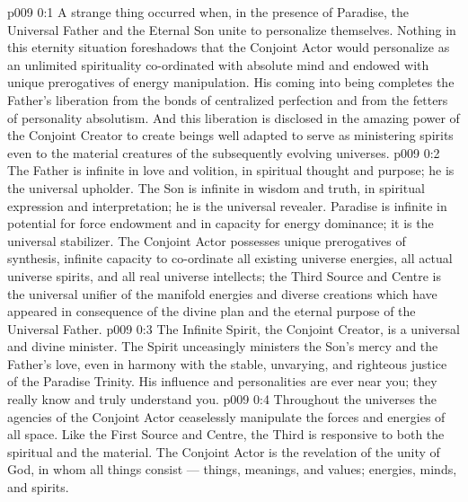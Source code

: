 \author{Divine Counsellor}
\vs p009 0:1 A strange thing occurred when, in the presence of Paradise, the Universal Father and the Eternal Son unite to personalize themselves. Nothing in this eternity situation foreshadows that the Conjoint Actor would personalize as an unlimited spirituality co\hyp{}ordinated with absolute mind and endowed with unique prerogatives of energy manipulation. His coming into being completes the Father’s liberation from the bonds of centralized perfection and from the fetters of personality absolutism. And this liberation is disclosed in the amazing power of the Conjoint Creator to create beings well adapted to serve as ministering spirits even to the material creatures of the subsequently evolving universes.
\vs p009 0:2 \pc The Father is infinite in love and volition, in spiritual thought and purpose; he is the universal upholder. The Son is infinite in wisdom and truth, in spiritual expression and interpretation; he is the universal revealer. Paradise is infinite in potential for force endowment and in capacity for energy dominance; it is the universal stabilizer. The Conjoint Actor possesses unique prerogatives of synthesis, infinite capacity to co\hyp{}ordinate all existing universe energies, all actual universe spirits, and all real universe intellects; the Third Source and Centre is the universal unifier of the manifold energies and diverse creations which have appeared in consequence of the divine plan and the eternal purpose of the Universal Father.
\vs p009 0:3 The Infinite Spirit, the Conjoint Creator, is a universal and divine minister. The Spirit unceasingly ministers the Son’s mercy and the Father’s love, even in harmony with the stable, unvarying, and righteous justice of the Paradise Trinity. His influence and personalities are ever near you; they really know and truly understand you.
\vs p009 0:4 Throughout the universes the agencies of the Conjoint Actor ceaselessly manipulate the forces and energies of all space. Like the First Source and Centre, the Third is responsive to both the spiritual and the material. The Conjoint Actor is the revelation of the unity of God, in whom all things consist --- things, meanings, and values; energies, minds, and spirits.
